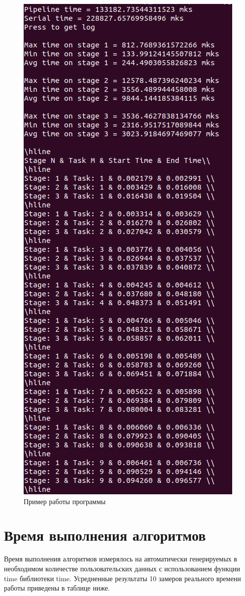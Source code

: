 \documentclass[12pt]{report}
\begin{document}
    \captionsetup{singlelinecheck=true}
    \begin{figure}[H]
    	\centering
    	\includegraphics[width=0.55\linewidth]{img/example}
    	\caption{Пример работы программы}
    	\label{fig:ex}
    \end{figure}
    
    
    
    \section{Время выполнения алгоритмов}
    Время выполнения алгоритмов измерялось на автоматически генерируемых в необходимом количестве пользовательских данных с использованием функции time библиотеки time. Усредненные результаты 10 замеров реального времени работы приведены в таблице ниже.
    
\end{document}
